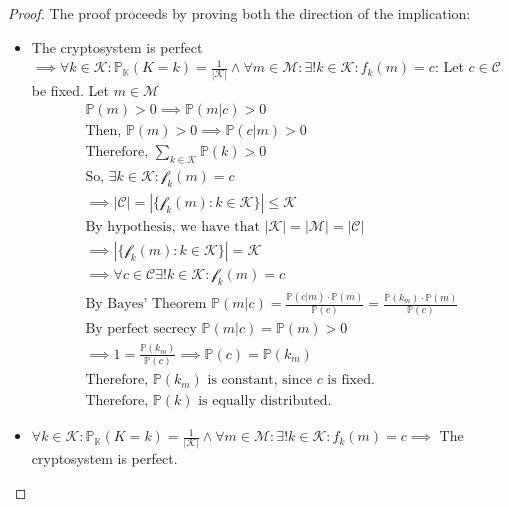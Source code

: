 \begin{proof}
    The proof proceeds by proving both the direction of the implication:
    \begin{itemize}
        \item The cryptosystem is perfect $\implies \forall k \in \mathcal{K}: \mathbb{P}_{\mathbb{K}}(K = k) = \frac{1}{|\mathcal{K}|} \land\forall m \in \mathcal{M}: \exists ! k \in \mathcal{K}: f_{k}(m) = c$:
        Let $c \in \mathcal{C}$ be fixed. Let $m \in \mathcal{M}$
        \noindent
        \begin{gather*}
            \mathbb{P}(m) > 0 \implies \mathbb{P}(m|c) > 0\\
            \text{Then, } \mathbb{P}(m) > 0 \implies \mathbb{P}(c|m) > 0\\ \text{Therefore, } \sum_{k \in \mathcal{K}}\mathbb{P}(k) > 0 \\
            \text{So, } \exists k \in \mathcal{K}: \mathcal{f}_{k}(m) = c\\
            \implies |\mathcal{C}| = |\{\mathcal{f}_{k}(m): k \in \mathcal{K}\}| \leq \mathcal{K}\\
            \text{By hypothesis, we have that } |\mathcal{K}| = |\mathcal{M}| = |\mathcal{C}|\\
            \implies |\{\mathcal{f}_{k}(m): k \in \mathcal{K}\}| = \mathcal{K}\\
            \implies \forall c \in \mathcal{C} \exists ! k \in \mathcal{K} : \mathcal{f}_{k}(m) = c\\
            \text{By Bayes' Theorem }\mathbb{P}(m|c) = \frac{\mathbb{P}(c|m) \cdot \mathbb{P}(m)}{\mathbb{P}(c)} = \frac{\mathbb{P}(k_{m}) \cdot \mathbb{P}(m)}{\mathbb{P}(c)}\\
            \text{By perfect secrecy }\mathbb{P}(m|c) = \mathbb{P}(m) > 0\\
            \implies 1 = \frac{\mathbb{P}(k_{m})}{\mathbb{P}(c)} \implies \mathbb{P}(c) = \mathbb{P}(k_{m})\\
            \text{Therefore, } \mathbb{P}(k_{m}) \text{ is constant, since } c \text{ is fixed.}\\
            \text{Therefore, } \mathbb{P}(k) \text{ is equally distributed.}
        \end{gather*}
        \item $\forall k \in \mathcal{K}: \mathbb{P}_{\mathbb{K}}(K = k) = \frac{1}{|\mathcal{K}|} \land\forall m \in \mathcal{M}: \exists ! k \in \mathcal{K}: f_{k}(m) = c \implies$ The cryptosystem is perfect.
        \begin{itemize}

\end{itemize}
\end{itemize}
\end{proof}
